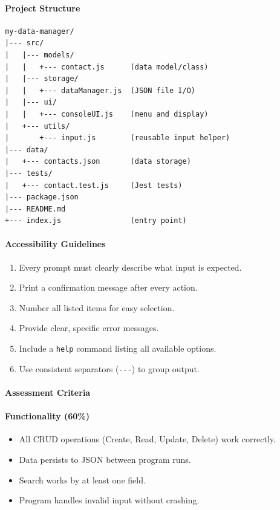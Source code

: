 \documentclass[
  justified,
  openright,
]{tufte-book}
\let\subsection\paragraph
\let\paragraph\paragraph
\let\subsection\paragraph
\let\paragraph\paragraph
\providecommand{\tightlist}{%
  \setlength{\itemsep}{0pt}\setlength{\parskip}{0pt}}
\begin{document}
\subsection{Project Structure}\label{project-structure}

\begin{verbatim}
my-data-manager/
|--- src/
|   |--- models/
|   |   +--- contact.js      (data model/class)
|   |--- storage/
|   |   +--- dataManager.js  (JSON file I/O)
|   |--- ui/
|   |   +--- consoleUI.js    (menu and display)
|   +--- utils/
|       +--- input.js        (reusable input helper)
|--- data/
|   +--- contacts.json       (data storage)
|--- tests/
|   +--- contact.test.js     (Jest tests)
|--- package.json
|--- README.md
+--- index.js                (entry point)
\end{verbatim}

\subsection{Accessibility Guidelines}\label{accessibility-guidelines}

\begin{enumerate}
\def\labelenumi{\arabic{enumi}.}
\tightlist
\item
  Every prompt must clearly describe what input is expected.
\item
  Print a confirmation message after every action.
\item
  Number all listed items for easy selection.
\item
  Provide clear, specific error messages.
\item
  Include a \texttt{help} command listing all available options.
\item
  Use consistent separators (\texttt{-\/-\/-}) to group output.
\end{enumerate}

\subsection{Assessment Criteria}\label{assessment-criteria-1}

\subsection{Functionality (60\%)}\label{functionality-60-1}

\begin{itemize}
\tightlist
\item[$\square$]
  All CRUD operations (Create, Read, Update, Delete) work correctly.
\item[$\square$]
  Data persists to JSON between program runs.
\item[$\square$]
  Search works by at least one field.
\item[$\square$]
  Program handles invalid input without crashing.
\end{itemize}
\end{document}
